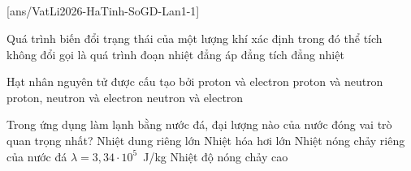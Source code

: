 \def\CheDo{solcolor}%
\def\tenchuong{Sở GD\&ĐT Hà Tĩnh -- Lần 1}
\def\thuonghieu{VẬT LÍ 12 -- Eduzy.com.vn}
\def\TachCauDS{1}
\def\TachCauLG{1}




	\noindent
	\subsection*{}
	\setcounter{ex}{0}
	[ans/VatLi2026-HaTinh-SoGD-Lan1-1]

	\begin{ex}%
		Quá trình biến đổi trạng thái của một lượng khí xác định trong đó thể tích không đổi gọi là quá trình
		\choice
		{đoạn nhiệt}
		{đẳng áp}
		{\True đẳng tích}
		{đẳng nhiệt}
	\end{ex}

	\begin{ex}%
		Hạt nhân nguyên tử được cấu tạo bởi
		\choice
		{proton và electron}
		{\True proton và neutron}
		{proton, neutron và electron}
		{neutron và electron}
	\end{ex}

	\begin{ex}%
		Trong ứng dụng làm lạnh bằng nước đá, đại lượng nào của nước đóng vai trò quan trọng nhất?
		\choice
		{Nhiệt dung riêng lớn}
		{Nhiệt hóa hơi lớn}
		{\True Nhiệt nóng chảy riêng của nước đá $\lambda=3{,}34\cdot 10^5$~J/kg}
		{Nhiệt độ nóng chảy cao}
	\end{ex}

